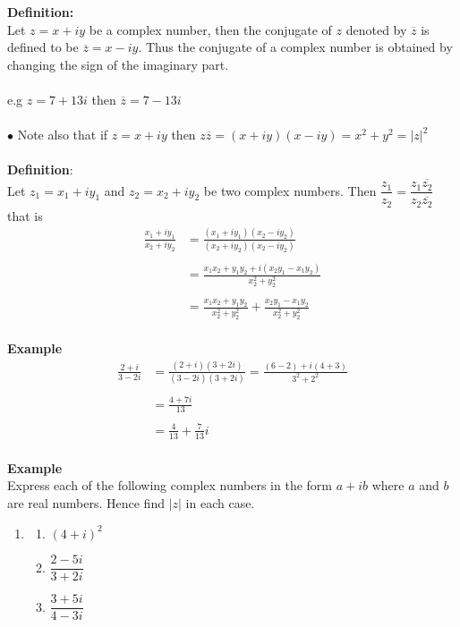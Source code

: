 \documentclass[11pt,a4paper]{article}
\begin{document}
\textbf{Definition:}\\
Let $z=x+iy$ be a complex number, then the conjugate of $z$ denoted by $\overline{z}$ is defined to be $\overline{z}=x-iy$. Thus the conjugate of a complex number is obtained by changing the sign of the imaginary part.\\\\
e.g $z=7+13i$ then $\overline{z}=7-13i$\\\\

$\bullet$ Note also that if $z=x+iy$ then $z\overline{z}=(x+iy)(x-iy)=x^2+y^2=|z|^2$\\\\

\textbf{Definition}:\\
Let $z_1=x_1+iy_1$ and $z_2=x_2+iy_2$ be two complex numbers. Then $\dfrac{z_1}{z_2}=\dfrac{z_1\overline{z_2}}{z_2\overline{z_2}}$ that is
\begin{align*}
\frac{x_1+iy_1}{x_2+iy_2} & =\frac{(x_1+iy_1)(x_2-iy_2)}{(x_2+iy_2)(x_2-iy_2)}\\\\
                          & = \frac{x_1x_2+y_1y_2+i(x_2y_1-x_1y_2)}{x_2^2+y_2^2}\\\\
                          & = \frac{x_1x_2+y_1y_2}{x_2^2+y^2_2}+\frac{x_2y_1-x_1y_2}{x^2_2+y^2_2}\\
\end{align*}



\textbf{Example}
\begin{align*}
\frac{2+i}{3-2i} & = \frac{(2+i)(3+2i)}{(3-2i)(3+2i)} = \frac{(6-2)+i(4+3)}{3^2+2^2}\\\\
                 & = \frac{4+7i}{13}\\\\
                 & = \frac{4}{13}+\frac{7}{13}i\\
\end{align*}



\textbf{Example}\\
Express each of the following complex numbers in the form $a+ib$ where $a$ and $b$ are real numbers. Hence find $|z|$ in each  case.
\begin{enumerate}
\item[]
\begin{enumerate}
     \item $(4+i)^2$
     \item $\dfrac{2-5i}{3+2i}$\\
     \item $\dfrac{3+5i}{4-3i}$
\end{enumerate}
\end{enumerate}
\end{document}

